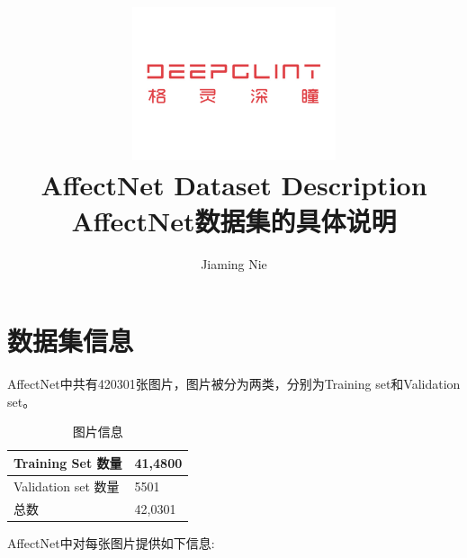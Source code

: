 \documentclass[11pt, a4paper]{article}
\title{\includegraphics[width=0.45\textwidth]{dg}
        \\AffectNet Dataset Description  \\ AffectNet数据集的具体说明  }          %
\author{Jiaming Nie}                    %
\begin{document}
\begin{titlepage}
	
\maketitle
{} %




\thispagestyle{empty}  %

\end{titlepage}









\section{数据集信息}

AffectNet中共有420301张图片，图片被分为两类，分别为Training set和Validation set。

\begin{table}[htbp] 
	\begin{center}
		\caption{图片信息}
		\begin{tabular}{|l|p{200pt}|} \hline
		Training Set 数量 & 41,4800 \\ \hline
		Validation set 数量 & 5501 \\ \hline
		总数  & 42,0301  \\ \hline
		\end{tabular}
		
		\label{tab:kf_}
	\end{center}
\end{table}

AffectNet中对每张图片提供如下信息:
\end{document}
